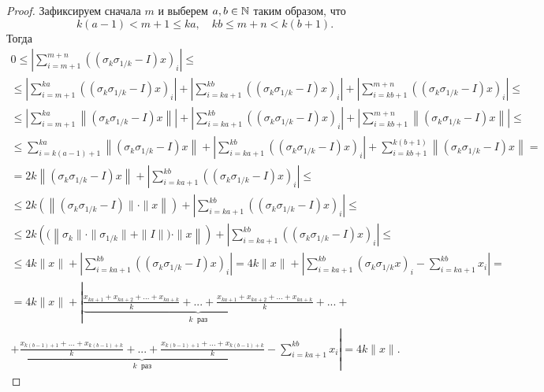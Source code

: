 \begin{proof}
	Зафиксируем сначала $m$ и выберем $a,b\in\mathbb{N}$
	таким образом, что
	\begin{equation}
		k(a-1) <    m+1 \leq ka
		,
		\quad
		kb     \leq m+n <    k(b+1)
		.
	\end{equation}
	Тогда
	\begin{multline}
		0 \leq \left|
		\sum_{i=m     +1}^{m+n} \left( (\sigma_k \sigma_{1/k} - I)x \right)_i
		\right|
		\leq
		\\\leq
		\left|\sum_{i=m     +1}^{ka    } \left( (\sigma_k \sigma_{1/k} - I)x \right)_i\right| +
		\left|\sum_{i=ka    +1}^{kb    } \left( (\sigma_k \sigma_{1/k} - I)x \right)_i\right| +
		\left|\sum_{i=kb    +1}^{m+n   } \left( (\sigma_k \sigma_{1/k} - I)x \right)_i\right|
		\leq
		\\\leq
		\left|\sum_{i=m     +1}^{ka    } \left\| (\sigma_k \sigma_{1/k} - I)x \right\|\right| +
		\left|\sum_{i=ka    +1}^{kb    } \left( (\sigma_k \sigma_{1/k} - I)x \right)_i\right| +
		\left|\sum_{i=kb    +1}^{m+n   } \left\| (\sigma_k \sigma_{1/k} - I)x \right\|\right|
		\leq
		\\\leq
		      \sum_{i=k(a-1)+1}^{ka    } \left\| (\sigma_k \sigma_{1/k} - I)x \right\| +
		\left|\sum_{i=ka    +1}^{kb    } \left( (\sigma_k \sigma_{1/k} - I)x \right)_i\right| +
		      \sum_{i=kb    +1}^{k(b+1)} \left\| (\sigma_k \sigma_{1/k} - I)x \right\|
		=
		\\=
		2k \left\| (\sigma_k \sigma_{1/k} - I)x \right\| +
		\left|\sum_{i=ka    +1}^{kb    } \left( (\sigma_k \sigma_{1/k} - I)x \right)_i\right|
		\leq
		\\\leq
		2k \left(\left\| (\sigma_k \sigma_{1/k} - I)\| \cdot \|x \right\|\right) +
		\left|\sum_{i=ka    +1}^{kb    } \left( (\sigma_k \sigma_{1/k} - I)x \right)_i\right|
		\leq
		\\\leq
		2k \left( (\left\|\sigma_k\| \cdot \| \sigma_{1/k}\| + \|I\|) \cdot \|x \right\|\right) +
		\left|\sum_{i=ka    +1}^{kb    } \left( (\sigma_k \sigma_{1/k} - I)x \right)_i\right|
		\leq
		\\\leq
		4k  \|x \| +
		\left|\sum_{i=ka    +1}^{kb    } \left( (\sigma_k \sigma_{1/k} - I)x \right)_i\right|
		=
		4k  \|x \| +
		\left|\sum_{i=ka    +1}^{kb    } (\sigma_k \sigma_{1/k}x)_i - \sum_{i=ka    +1}^{kb    } x_i\right|
		=
		\\=
		4k  \|x \| +
		\left|
			\underbrace{\frac{x_{ka+1} + x_{ka+2} + ... + x_{ka+k}}{k} + ... + \frac{x_{ka+1} + x_{ka+2} + ... + x_{ka+k}}{k}}_{k~\text{~раз}}
			+
			...+
		\right.
		\\
		\left.
			+
			\underbrace{\frac{x_{k(b-1)+1}  + ... + x_{k(b-1)+k}}{k} + ... + \frac{x_{k(b-1)+1} + ... + x_{k(b-1)+k}}{k}}_{k~\text{~раз}}
			-\sum_{i=ka    +1}^{kb    } x_i
		\right|
		=
		4k\|x\|
		.
	\end{multline}


\end{proof}
